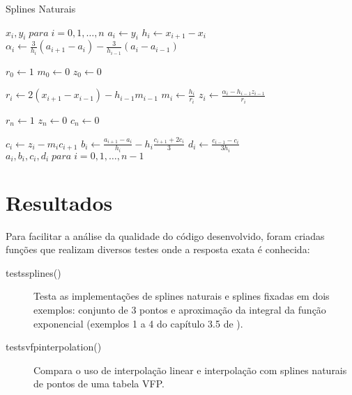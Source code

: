 \documentclass[final,5p]{elsarticle}
\numberwithin{equation}{section}
\begin{document}
        \begin{algorithm}
            \caption{Splines Naturais}\label{alg:splines}
            \begin{algorithmic}
                \Require $x_i,y_i \; para \; i=0,1,\ldots,n$
                    \State $a_i \gets y_i$
                \EndFor
                    \State $h_i \gets x_{i+1} - x_i$
                \EndFor
                    \State $\alpha_i \gets \frac{3}{h_i} (a_{i+1}-a_i) - \frac{3}{h_{i-1}} (a_i-a_{i-1})$
                \EndFor
                
                \State $r_0 \gets 1$
                \State $m_0 \gets 0$
                \State $z_0 \gets 0$
                
                    \State $r_i \gets 2 (x_{i+1} - x_{i-1}) - h_{i-1} m_{i-1}$
                    \State $m_i \gets \frac{h_i}{r_i}$
                    \State $z_i \gets \frac{\alpha_i - h_{i-1} z_{i-1}}{r_i}$
                \EndFor
                
                \State $r_n \gets 1$
                \State $z_n \gets 0$
                \State $c_n \gets 0$
                
                    \State $c_i \gets z_i - m_i c_{i+1}$
                    \State $b_i \gets \frac{a_{i+1} - a_i}{h_i} - h_i \frac{c_{i+1} + 2 c_i}{3}$
                    \State $d_i \gets \frac{c_{i-1} - c_i}{3 h_i}$
                \EndFor
                \State \Return $a_i,b_i,c_i,d_i \; para \; i=0,1,\ldots,n-1$
            \end{algorithmic}
        \end{algorithm}
    
    \section{Resultados}
    
        Para facilitar a análise da qualidade do código desenvolvido, foram criadas funções que realizam diversos testes onde a resposta exata é conhecida:

        \begin{description}
            \item[tests\textunderscore splines()] Testa as implementações de splines naturais e splines fixadas em dois exemplos: conjunto de 3 pontos e aproximação da integral da função exponencial (exemplos 1 a 4 do capítulo 3.5 de \cite{burden2016analise}).
            
            \item[tests\textunderscore vfp\textunderscore interpolation()] Compara o uso de interpolação linear e interpolação com splines naturais de pontos de uma tabela VFP.
        \end{description}
\end{document}
